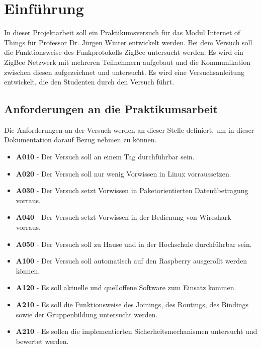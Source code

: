 \chapter{Einführung}

In dieser Projektarbeit soll ein Praktikumsversuch für das Modul \grqq Internet of Things\grqq{} für Professor Dr. Jürgen Winter 
entwickelt werden. Bei dem Versuch soll die Funktionsweise des Funkprotokolls ZigBee untersucht werden. Es wird ein 
ZigBee Netzwerk mit mehreren Teilnehmern aufgebaut und die Kommunikation zwischen diesen aufgezeichnet und untersucht. 
Es wird eine Versuchsanleitung entwickelt, die den Studenten durch den Versuch führt.

\section{Anforderungen an die Praktikumsarbeit}

Die Anforderungen an der Versuch werden an dieser Stelle definiert, um in dieser Dokumentation 
darauf Bezug nehmen zu können.
\begin{itemize}
    \item \textbf{A010} - Der Versuch soll an einem Tag durchführbar sein.
    \item \textbf{A020} - Der Versuch soll nur wenig Vorwissen in Linux vorraussetzen.
    \item \textbf{A030} - Der Versuch setzt Vorwissen in Paketorientierten Datenübetragung vorraus.
    \item \textbf{A040} - Der Versuch setzt Vorwissen in der Bedienung von Wireshark vorraus.
    \item \textbf{A050} - Der Versuch soll zu Hause und in der Hochschule durchführbar sein.
    \item \textbf{A100} - Der Versuch soll automatisch auf den Raspberry ausgerollt werden können.
    \item \textbf{A120} - Es soll aktuelle und quelloffene Software zum Einsatz kommen.
    \item \textbf{A210} - Es soll die Funktionsweise des Joinings, des Routings, des Bindings sowie der Gruppenbildung untersucht werden.
    \item \textbf{A210} - Es sollen die implementierten Sicherheitsmechanismen untersucht und bewertet werden.
\end{itemize}

